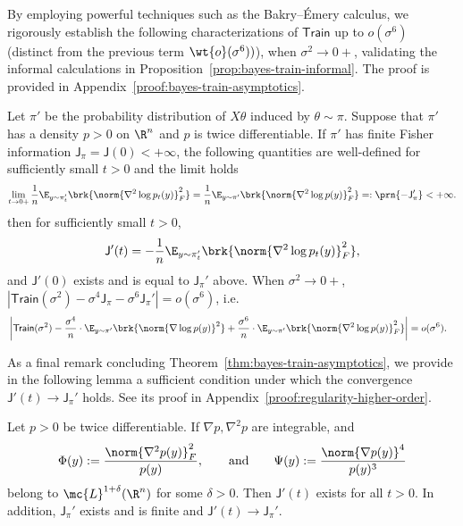 \documentclass[11pt]{article}
\newcommand{\tfunc}{\mathsf{Train}}
\newcommand{\jfunc}{\mathsf{J}}
\begin{document}
By employing powerful techniques such as the Bakry–\'{E}mery calculus, we rigorously establish the following characterizations of $\tfunc$ up to $o(\sigma^6)$ (distinct from the previous term $\wt{o}(\sigma^6))$), when $\sigma^2 \to 0+$, validating the informal calculations in Proposition~\ref{prop:bayes-train-informal}. The proof is provided in Appendix~\ref{proof:bayes-train-asymptotics}.

\begin{theorem} \label{thm:bayes-train-asymptotics}
    Let $\pi'$ be the probability distribution of $X\theta$ induced by $\theta \sim \pi$.  Suppose that $\pi'$ has a density $p > 0$ on $\R^n$ and $ p$ is twice differentiable. If $\pi'$ has finite Fisher information $\jfunc_{\pi} = \jfunc(0) < +\infty$, the following quantities are well-defined for sufficiently small $t > 0$ and the limit holds
        \begin{align*}
            \lim_{t \to 0+} \frac{1}{n} \E_{y \sim \pi_t'} \brk{\norm{\nabla^2 \log p_t(y)}_F^2} = \frac{1}{n} \E_{y \sim \pi'} \brk{\norm{\nabla^2 \log p(y)}_F^2} =: \prn{-\jfunc_{\pi}'} < +\infty.
        \end{align*}
        then for sufficiently small $t > 0$,
        \begin{align*}
            \jfunc'(t) = - \frac{1}{n} \E_{y \sim \pi_t'} \brk{\norm{\nabla^2 \log p_t(y)}_F^2},
        \end{align*}
        and $\jfunc'(0)$ exists and is equal to $\jfunc_{\pi}'$ above. When $\sigma^2 \to 0+$, $|\tfunc(\sigma^2) - \sigma^4 \jfunc_{\pi} - \sigma^6 \jfunc_{\pi}'| = o(\sigma^6)$, i.e.\
        \begin{align*}
            & \left|\tfunc(\sigma^2) - \frac{\sigma^4}{n} \cdot \E_{y \sim \pi'} \brk{\norm{\nabla \log p(y)}^2} + \frac{\sigma^6}{n} \cdot \E_{y \sim \pi'} \brk{\norm{\nabla^2 \log p(y)}_F^2} \right|  = o(\sigma^6).
        \end{align*}
\end{theorem}
As a final remark concluding Theorem~\ref{thm:bayes-train-asymptotics}, we provide in the following lemma a sufficient condition under which the convergence $\jfunc'(t) \to \jfunc_\pi'$ holds. See its proof in Appendix~\ref{proof:regularity-higher-order}.
\begin{lemma} \label{lem:regularity-higher-order}
    Let $p>0$ be twice differentiable. If $\nabla p, \nabla^2 p$ are integrable, and
    \begin{align*}
        \Phi(y) := \frac{\norm{\nabla^2 p(y)}_F^2}{p(y)}, \qquad \text{and} \qquad \Psi(y) := \frac{\norm{\nabla p(y)}^4}{p(y)^3}
    \end{align*}
    belong to $\mc{L}^{1+\delta}(\R^n)$ for some $\delta > 0$. Then $\jfunc'(t)$ exists for all $t > 0$. In addition, $\jfunc_\pi'$ exists and is finite and $\jfunc'(t) \to \jfunc_\pi'$.
\end{lemma}
\end{document}
